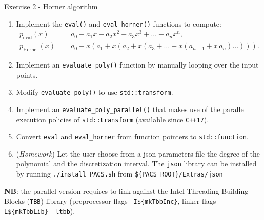 \documentclass[10pt,aspectratio=169]{beamer}
\begin{document}
\begin{frame}{Exercise 2 - Horner algorithm}
		
\begin{enumerate}
    \item Implement the \texttt{eval()} and \texttt{eval\_horner()} functions to compute:
    \begin{align*}
        p_\text{eval}(x) &= a_0 + a_1x + a_2x^2 + a_3x^3 + \ldots + a_nx^n, \\
        p_\text{Horner}(x) &= a_0 + x \left(a_1 + x \left(a_2 + x \left(a_3 + \ldots + x\left(a_{n-1} + x \, a_n\right) \ldots \right) \right) \right).
    \end{align*}
    \item Implement an \texttt{evaluate\_poly()} function by manually looping over the input points.
    \item Modify \texttt{evaluate\_poly()} to use \texttt{std::transform}.
    \item Implement an \texttt{evaluate\_poly\_parallel()} that makes use of the parallel execution policies of \texttt{std::transform} (available since \texttt{C++17}).
    \item Convert \texttt{eval} and \texttt{eval\_horner} from function pointers to \texttt{std::function}.
    \item (\textit{Homework}) Let the user choose from a json parameters file the degree of the polynomial and the discretization interval. The \texttt{json} library can be installed by running \texttt{./install\_PACS.sh} from \texttt{\$\{PACS\_ROOT\}/Extras/json}
\end{enumerate}

\textbf{NB}: the parallel version requires to link against the Intel Threading Building Blocks (\texttt{TBB}) library (preprocessor flags \texttt{-I\$\{mkTbbInc\}}, linker flags \texttt{-L\$\{mkTbbLib\} -ltbb}).
\end{frame}
\end{document}
